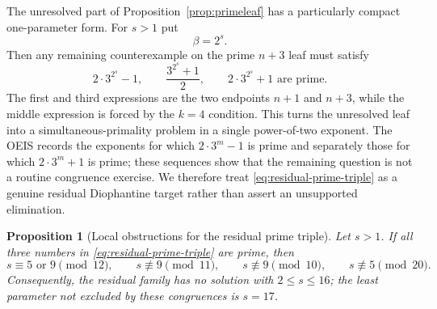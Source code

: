 \documentclass[11pt]{article}
\newtheorem{proposition}[theorem]{Proposition}
\begin{document}
The unresolved part of Proposition~\ref{prop:primeleaf} has a particularly
compact one-parameter form.  For $s>1$ put
\[
\beta=2^s.
\]
Then any remaining counterexample on the prime $n+3$ leaf must satisfy
\[
\boxed{
2\cdot3^{2^s}-1,
\qquad
\frac{3^{2^s}+1}{2},
\qquad
2\cdot3^{2^s}+1
\text{ are prime}.
}
\tag{41}\label{eq:residual-prime-triple}
\]
The first and third expressions are the two endpoints $n+1$ and $n+3$,
while the middle expression is forced by the $k=4$ condition.  This turns
the unresolved leaf into a simultaneous-primality problem in a single
power-of-two exponent.  The OEIS records the exponents for which
$2\cdot3^m-1$ is prime and separately those for which $2\cdot3^m+1$ is
prime; these sequences show that the remaining question is not a routine
congruence exercise.  We therefore treat \eqref{eq:residual-prime-triple}
as a genuine residual Diophantine target rather than assert an unsupported
elimination.

\begin{proposition}[Local obstructions for the residual prime triple]
\label{prop:triple-sieve}
Let \(s>1\).  If all three numbers in
\eqref{eq:residual-prime-triple} are prime, then
\[
\boxed{
s\equiv5\text{ or }9\pmod{12},\qquad
s\not\equiv9\pmod{11},\qquad
s\not\equiv9\pmod{10},\qquad
s\not\equiv5\pmod{20}.
}
\]
Consequently, the residual family has no solution with \(2\leq s\leq16\);
the least parameter not excluded by these congruences is \(s=17\).
\end{proposition}
\end{document}
